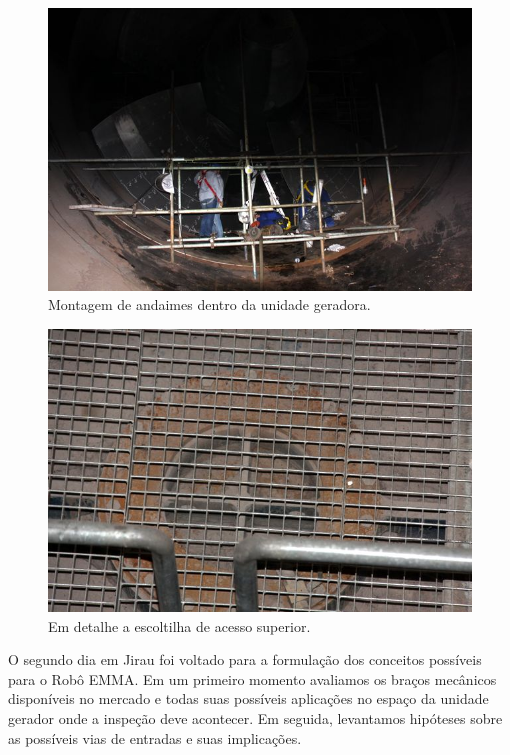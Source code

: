 \documentclass[a4paper,11pt,oneside,openany,brazilian,version=last,draft=false,]{main}
\begin{document}
\begin{twocolumn}






\begin{figure}[H]
\centering
\includegraphics[width=\columnwidth]{Fotos/img_4931.jpg}
\caption{Montagem de andaimes dentro da unidade geradora.}
\end{figure}

\begin{figure}[H]
\centering
\includegraphics[width=\columnwidth]{Fotos/img_4978.jpg}
\caption{Em detalhe a escoltilha de acesso superior.}
\end{figure}

O segundo dia em Jirau foi voltado para a formulação dos conceitos possíveis
para o Robô EMMA. Em um primeiro momento avaliamos os braços mecânicos
disponíveis no mercado e todas suas possíveis aplicações no espaço da unidade
gerador onde a inspeção deve acontecer. Em seguida, levantamos hipóteses sobre
as possíveis vias de entradas e suas implicações. 


\end{twocolumn}
\end{document}
